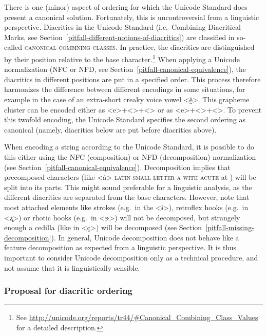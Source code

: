 There is one (minor) aspect of ordering for which the Unicode Standard does
present a canonical solution. Fortunately, this is uncontroversial from a
linguistic perspective. Diacritics in the Unicode Standard (i.e.~Combining
Diacritical Marks, see Section~\ref{pitfall-different-notions-of-diacritics})
are classified in so-called \textsc{canonical combining classes}. In practice,
the diacritics are distinguished by their position relative to the base
character.\footnote{See
\url{http://unicode.org/reports/tr44/\#Canonical\_Combining\_Class\_Values} for
a detailed description.} When applying a Unicode normalization (NFC or NFD, see
Section~\ref{pitfall-canonical-equivalence}), the diacritics in different
positions are put in a specified order. This process therefore harmonizes the
difference between different encodings in some situations, for example in the
case of an extra-short creaky voice vowel <ḛ̆>. This grapheme cluster can be
encoded either as <e>+<>+<> or as
<e>+<>+<>. To prevent this twofold encoding, the Unicode
Standard specifies the second ordering as canonical (namely, diacritics
below are put before diacritics above).


When encoding a string according to the Unicode Standard, it is possible to do
this either using the NFC (composition) or NFD (decomposition) normalization (see
Section~\ref{pitfall-canonical-equivalence}).
Decomposition implies that precomposed characters (like <á> \textsc{latin small
letter a with acute} at ) will be split into its parts. This might
sound preferable for a linguistic analysis, as the different diacritics are
separated from the base characters. However, note that most attached elements
like strokes (e.g.~in the <ɨ>), retroflex hooks (e.g.~in <ʐ>) or rhotic hooks
(e.g.~in <ɝ>) will not be decomposed, but strangely enough a cedilla (like in
<ç>) will be decomposed (see Section~\ref{pitfall-missing-decomposition}). In
general, Unicode decomposition does not behave like a feature decomposition as
expected from a linguistic perspective. It is thus important to consider Unicode
decomposition only as a technical procedure, and not assume that it is
linguistically sensible.

\subsubsection*{Proposal for diacritic ordering}

